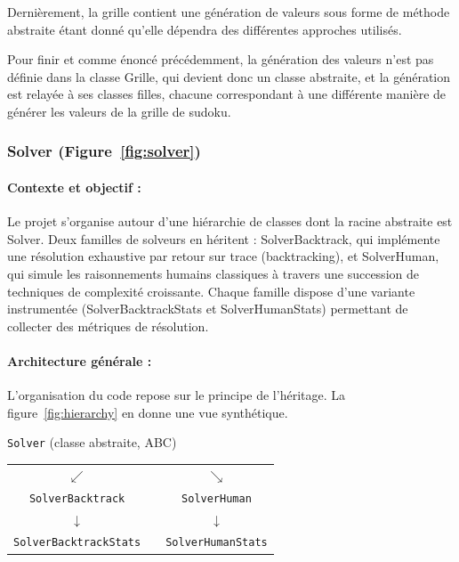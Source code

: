 \documentclass[a4paper]{article}
\begin{document}
Dernièrement, la grille contient une génération de valeurs sous forme de méthode abstraite étant donné qu’elle dépendra des différentes approches utilisés.

Pour finir et comme énoncé précédemment, la génération des valeurs n’est pas définie dans la classe Grille, qui devient donc un classe abstraite, et la génération est relayée à ses classes filles, chacune correspondant à une différente manière de générer les valeurs de la grille de sudoku.

\subsubsection{Solver  (\textbf{Figure~\ref{fig:solver}})} 

\paragraph{Contexte et objectif :}

Le projet s'organise autour d'une hiérarchie de classes dont la racine abstraite est
Solver. Deux familles de solveurs en héritent : SolverBacktrack, qui
implémente une résolution exhaustive par retour sur trace (backtracking), et
SolverHuman, qui simule les raisonnements humains classiques à travers une
succession de techniques de complexité croissante. Chaque famille dispose d'une
variante instrumentée (SolverBacktrackStats et SolverHumanStats) permettant
de collecter des métriques de résolution.

\paragraph{Architecture générale :}

L'organisation du code repose sur le principe de l'héritage. La figure~\ref{fig:hierarchy}
en donne une vue synthétique.

\begin{center}
\begin{tcolorbox}[infobox, title={}]
\begin{center}
\texttt{Solver} (classe abstraite, ABC)\\[4pt]
\begin{tabular}{ccc}
  $\swarrow$ & & $\searrow$ \\[2pt]
  \texttt{SolverBacktrack} & \hspace{2cm} & \texttt{SolverHuman} \\[4pt]
  $\downarrow$ & & $\downarrow$ \\[2pt]
  \texttt{SolverBacktrackStats} & & \texttt{SolverHumanStats}
\end{tabular}
\end{center}
\end{tcolorbox}
\label{fig:hierarchy}
\end{center}
\end{document}
